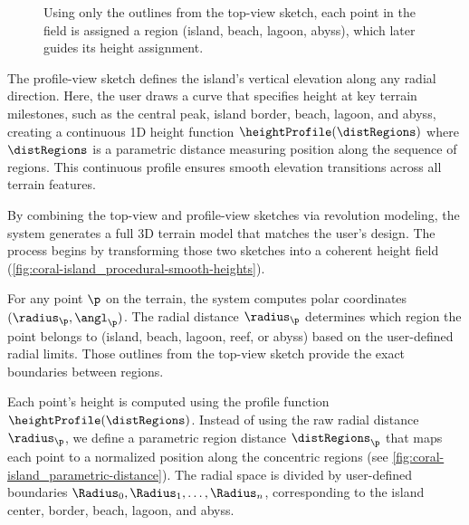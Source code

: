 \begin{figure}
    \caption{Using only the outlines from the top-view sketch, each point in the field is assigned a region (island, beach, lagoon, abyss), which later guides its height assignment.}
    \label{fig:coral-island_procedural-height-only}
\end{figure}

The profile-view sketch defines the island's vertical elevation along any radial direction. Here, the user draws a curve that specifies height at key terrain milestones, such as the central peak, island border, beach, lagoon, and abyss, creating a continuous 1D height function $\heightProfile(\distRegions)$ where $\distRegions$ is a parametric distance measuring position along the sequence of regions. This continuous profile ensures smooth elevation transitions across all terrain features.


By combining the top-view and profile-view sketches via revolution modeling, the system generates a full 3D terrain model that matches the user's design. The process begins by transforming those two sketches into a coherent height field (\cref{fig:coral-island_procedural-smooth-heights}).

For any point $\p$ on the terrain, the system computes polar coordinates $(\radius_\p, \angl_\p)$. The radial distance $\radius_\p$ determines which region the point belongs to (island, beach, lagoon, reef, or abyss) based on the user-defined radial limits. Those outlines from the top-view sketch provide the exact boundaries between regions.

Each point's height is computed using the profile function $\heightProfile(\distRegions)$. Instead of using the raw radial distance $\radius_\p$, we define a parametric region distance $\distRegions_\p$ that maps each point to a normalized position along the concentric regions (see \cref{fig:coral-island_parametric-distance}). The radial space is divided by user-defined boundaries $\Radius_0, \Radius_1, \dots, \Radius_n$, corresponding to the island center, border, beach, lagoon, and abyss.


